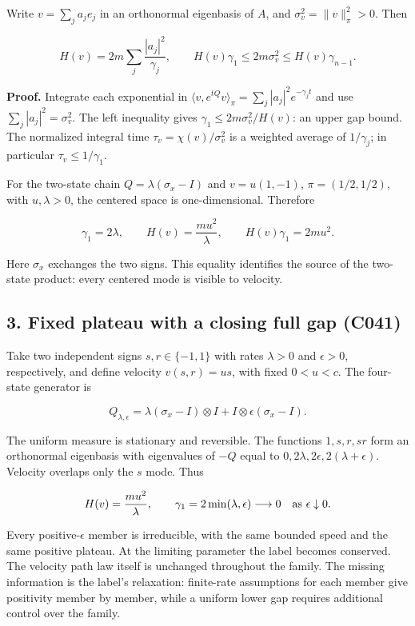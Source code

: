 \documentclass[11pt,a4paper]{article}
\begin{document}
Write \(v=\sum_j a_je_j\) in an orthonormal eigenbasis of \(A\), and
\(\sigma_v^2=\|v\|_\pi^2>0\). Then

\[
H(v)=2m\sum_j\frac{|a_j|^2}{\gamma_j},\qquad
H(v)\gamma_1\le2m\sigma_v^2\le H(v)\gamma_{n-1}.
\]

\textbf{Proof.} Integrate each exponential in
\(\langle v,e^{tQ}v\rangle_\pi=\sum_j|a_j|^2e^{-\gamma_jt}\) and use
\(\sum_j|a_j|^2=\sigma_v^2\). The left inequality gives
\(\gamma_1\le2m\sigma_v^2/H(v)\): an upper gap bound. The normalized
integral time \(\tau_v=\chi(v)/\sigma_v^2\) is a weighted average of
\(1/\gamma_j\); in particular \(\tau_v\le1/\gamma_1\).

For the two-state chain \(Q=\lambda(\sigma_x-I)\) and \(v=u(1,-1)\),
\(\pi=(1/2,1/2)\), with \(u,\lambda>0\), the centered space is
one-dimensional. Therefore

\[
\gamma_1=2\lambda,\qquad H(v)=\frac{mu^2}{\lambda},\qquad
H(v)\gamma_1=2mu^2.
\]

Here \(\sigma_x\) exchanges the two signs. This equality identifies the
source of the two-state product: every centered mode is visible to
velocity.

\hypertarget{fixed-plateau-with-a-closing-full-gap-c041}{%
\subsection{3. Fixed plateau with a closing full gap
(C041)}\label{fixed-plateau-with-a-closing-full-gap-c041}}

Take two independent signs \(s,r\in\{-1,1\}\) with rates \(\lambda>0\)
and \(\epsilon>0\), respectively, and define velocity \(v(s,r)=us\),
with fixed \(0<u<c\). The four-state generator is

\[
Q_{\lambda,\epsilon}=\lambda(\sigma_x-I)\otimes I
+I\otimes\epsilon(\sigma_x-I).
\]

The uniform measure is stationary and reversible. The functions
\(1,s,r,sr\) form an orthonormal eigenbasis with eigenvalues of \(-Q\)
equal to \(0,2\lambda,2\epsilon,2(\lambda+\epsilon)\). Velocity overlaps
only the \(s\) mode. Thus

\[
H(v)=\frac{mu^2}{\lambda},\qquad
\gamma_1=2\min(\lambda,\epsilon)\longrightarrow0
\quad\hbox{as }\epsilon\downarrow0.
\]

Every positive-\(\epsilon\) member is irreducible, with the same bounded
speed and the same positive plateau. At the limiting parameter the label
becomes conserved. The velocity path law itself is unchanged throughout
the family. The missing information is the label's relaxation:
finite-rate assumptions for each member give positivity member by
member, while a uniform lower gap requires additional control over the
family.
\end{document}
